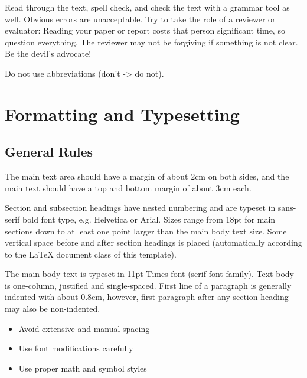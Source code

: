 \documentclass[11pt, a4paper,oneside,chapterprefix=false]{scrbook}
\begin{document}
Read through the text, spell check, and check the text with a grammar tool as well. Obvious errors are unacceptable.
Try to take the role of a reviewer or evaluator: Reading your paper or report costs that person significant time, so question everything. The reviewer may not be forgiving if something is not clear. Be the devil's advocate!

Do not use abbreviations (don't -> do not).

\section*{Formatting and Typesetting} \label{sec:formatting}

\subsection*{General Rules}

The main text area should have a margin of about 2cm on both sides, and the main text should have a top and bottom margin of about 3cm each.

Section and subsection headings have nested numbering and are typeset in sans-serif bold font type, e.g. Helvetica or Arial.  Sizes range from 18pt for main sections down to at least one point larger than the main body text size. Some vertical space before and after section headings is placed (automatically according to the LaTeX document class of this template).

The main body text is typeset in 11pt Times font (serif font family). Text body is one-column, justified and single-spaced. First line of a paragraph is generally indented with about 0.8cm, however, first paragraph after any section heading may also be non-indented.

\begin{itemize}
\item Avoid extensive and manual spacing
\item Use font modifications carefully
\item Use proper math and symbol styles
\end{itemize}
\end{document}
